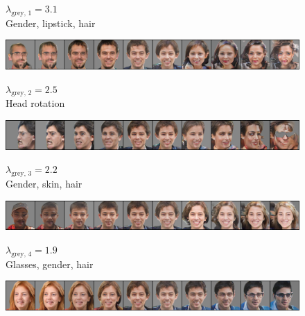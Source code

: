 \documentclass{article}
\begin{document}
\begin{figure}[H]
  \centering
  \begin{minipage}{.18\linewidth}
      \centering
      $\lambda_{\text{grey, 1}} = 3.1$ \\
      Gender, lipstick, hair
  \end{minipage}%
  \hfill
  \begin{minipage}{.81\linewidth}
      \centering
      \includegraphics[width=\linewidth]{eigen/grey_gan_1.png}
  \end{minipage}
\end{figure}

\begin{figure}[H]
  \centering
  \begin{minipage}{.18\linewidth}
      \centering
      $\lambda_{\text{grey, 2}} = 2.5$ \\
      Head rotation
  \end{minipage}%
  \hfill
  \begin{minipage}{.81\linewidth}
      \centering
      \includegraphics[width=\linewidth]{eigen/grey_gan_2.png}
  \end{minipage}
\end{figure}
  
\begin{figure}[H]
  \centering
  \begin{minipage}{.18\linewidth}
      \centering
      $\lambda_{\text{grey, 3}} = 2.2$ \\
      Gender, skin, hair
  \end{minipage}%
  \hfill
  \begin{minipage}{.81\linewidth}
      \centering
      \includegraphics[width=\linewidth]{eigen/grey_gan_3.png}
  \end{minipage}
\end{figure}

\begin{figure}[H]
  \centering
  \begin{minipage}{.18\linewidth}
      \centering
      $\lambda_{\text{grey, 4}} = 1.9$ \\
      Glasses, gender, hair
  \end{minipage}%
  \hfill
  \begin{minipage}{.81\linewidth}
      \centering
      \includegraphics[width=\linewidth]{eigen/grey_gan_4.png}
  \end{minipage}
\end{figure}
\end{document}
